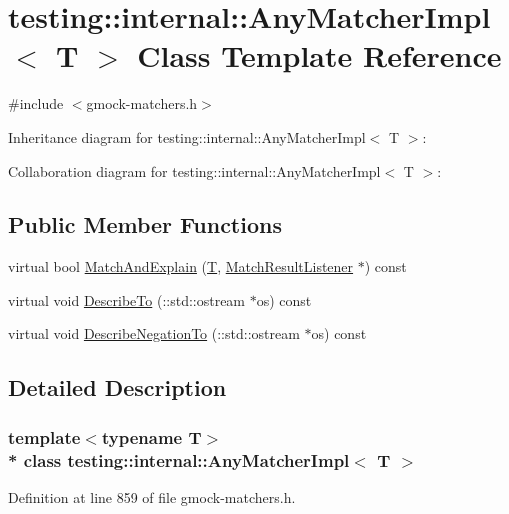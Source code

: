 \hypertarget{classtesting_1_1internal_1_1_any_matcher_impl}{}\section{testing\+:\+:internal\+:\+:Any\+Matcher\+Impl$<$ T $>$ Class Template Reference}
\label{classtesting_1_1internal_1_1_any_matcher_impl}


{\ttfamily \#include $<$gmock-\/matchers.\+h$>$}



Inheritance diagram for testing\+:\+:internal\+:\+:Any\+Matcher\+Impl$<$ T $>$\+:


Collaboration diagram for testing\+:\+:internal\+:\+:Any\+Matcher\+Impl$<$ T $>$\+:
\subsection*{Public Member Functions}
\begin{DoxyCompactItemize}
\item 
virtual bool \hyperlink{classtesting_1_1internal_1_1_any_matcher_impl_a03fe8956cfe9827b0ceacbd130fb88c1}{Match\+And\+Explain} (\hyperlink{functions__7_8js_adf1f3edb9115acb0a1e04209b7a9937b}{T}, \hyperlink{classtesting_1_1_match_result_listener}{Match\+Result\+Listener} $\ast$) const 
\item 
virtual void \hyperlink{classtesting_1_1internal_1_1_any_matcher_impl_ae68a082e0c85a0b6f3502698e60333a8}{Describe\+To} (\+::std\+::ostream $\ast$os) const 
\item 
virtual void \hyperlink{classtesting_1_1internal_1_1_any_matcher_impl_ae403b0e2cf75db076e3465c579a2175b}{Describe\+Negation\+To} (\+::std\+::ostream $\ast$os) const 
\end{DoxyCompactItemize}


\subsection{Detailed Description}
\subsubsection*{template$<$typename T$>$\\*
class testing\+::internal\+::\+Any\+Matcher\+Impl$<$ T $>$}



Definition at line 859 of file gmock-\/matchers.\+h.



